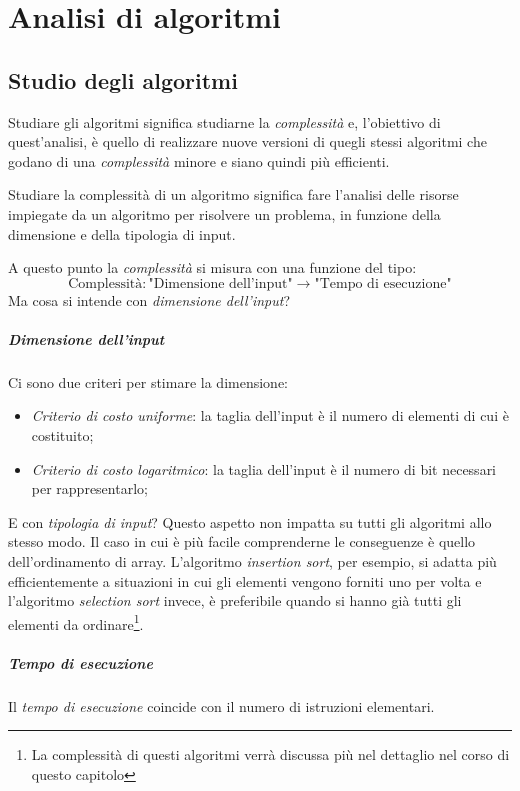 \chapter{Analisi di algoritmi}

\section{Studio degli algoritmi}
Studiare gli algoritmi significa studiarne la \emph{complessità} e, l'obiettivo
di quest'analisi, è quello di realizzare nuove versioni di quegli stessi
algoritmi che godano di una \emph{complessità} minore e siano quindi più
efficienti.

\begin{definition}
    Studiare la complessità di un algoritmo significa fare l'analisi delle risorse
    impiegate da un algoritmo per risolvere un problema, in funzione della
    dimensione e della tipologia di input.
\end{definition}\noindent
A questo punto la \emph{complessità} si misura con una funzione del tipo:
\[\text{Complessità}:\text{"Dimensione dell'input"}\rightarrow
\text{"Tempo di esecuzione"}\]
Ma cosa si intende con \emph{dimensione dell'input}?

\paragraph{Dimensione dell'input}
Ci sono due criteri per stimare la dimensione:
\begin{itemize}
    \item \emph{Criterio di costo uniforme}: la taglia dell’input è il numero
    di elementi di cui è costituito;
    \item \emph{Criterio di costo logaritmico}: la taglia dell’input è il
    numero di bit necessari per rappresentarlo;
\end{itemize}
E con \emph{tipologia di input}?
Questo aspetto non impatta su tutti gli algoritmi allo stesso modo. Il caso in
cui è più facile comprenderne le conseguenze è quello dell'ordinamento di array.
L'algoritmo \emph{insertion sort}, per esempio, si adatta più efficientemente
a situazioni in cui gli elementi vengono forniti uno per volta e l'algoritmo
\emph{selection sort} invece, è preferibile quando si hanno già tutti gli elementi
da ordinare\footnote{La complessità di questi algoritmi verrà discussa più nel
dettaglio nel corso di questo capitolo}.

\paragraph{Tempo di esecuzione}
Il \emph{tempo di esecuzione} coincide con il numero di istruzioni elementari.

